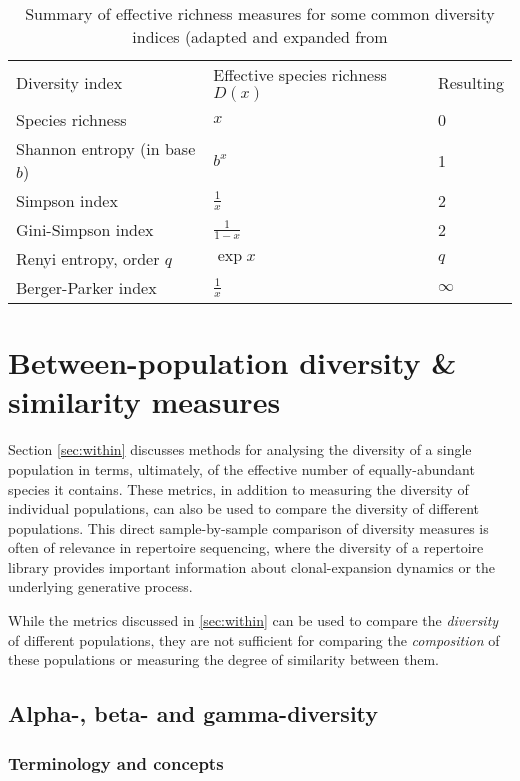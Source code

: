 \begin{table}
\caption{Summary of effective richness measures for some common diversity indices (adapted and expanded from \citep{jost2006entropy}}
\begin{tabular}{lll}
Diversity index & Effective species richness $D(x)$ & Resulting \\
Species richness & $x$ & 0 \\
Shannon entropy (in base $b$) & $b^x$ & 1\\
Simpson index & $\frac{1}{x}$ & 2\\
Gini-Simpson index & $\frac{1}{1-x}$ & 2\\
Renyi entropy, order $q$ & $\exp{x}$ & $q$\\
Berger-Parker index & $\frac{1}{x}$ & $\infty$
\end{tabular}
\label{tab:diversity}
\end{table}


\section{Between-population diversity \& similarity measures}

Section \ref{sec:within} discusses methods for analysing the diversity of a single population in terms, ultimately, of the effective number of equally-abundant species it contains. These metrics, in addition to measuring the diversity of individual populations, can also be used to compare the diversity of different populations. This direct sample-by-sample comparison of diversity measures is often of relevance in repertoire sequencing, where the diversity of a repertoire library provides important information about clonal-expansion dynamics or the underlying generative process. 

While the metrics discussed in \ref{sec:within} can be used to compare the \textit{diversity} of different populations, they are not sufficient for comparing the \textit{composition} of these populations or measuring the degree of similarity between them. %


\subsection{Alpha-, beta- and gamma-diversity}

\subsubsection{Terminology and concepts}

